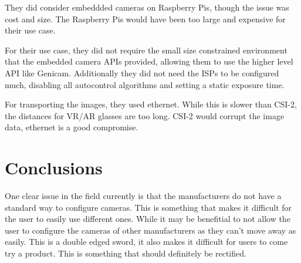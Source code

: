 They did consider embeddded cameras on Raspberry Pis, though the issue was cost
and size. The Raspberry Pis would have been too large and expensive for their
use case.

For their use case, they did not require the small size constrained environment
that the embedded camera APIs provided, allowing them to use the higher level
API like Genicam. Additionally they did not need the ISPs to be configured
much, disabling all autocontrol algorithms and setting a static exposure time.

For transporting the images, they used ethernet. While this is slower than
CSI-2, the distances for VR/AR glasses are too long. CSI-2 would corrupt the
image data, ethernet is a good compromise.

\section{Conclusions}
One clear issue in the field currently is that the manufacturers do not have a
standard way to configure cameras. This is something that makes it difficult
for the user to easily use different ones. While it may be benefitial to not
allow the user to configure the cameras of other manufacturers as they can't
move away as easily. This is a double edged sword, it also makes it difficult
for users to come try a product. This is something that should definitely be
rectified.
